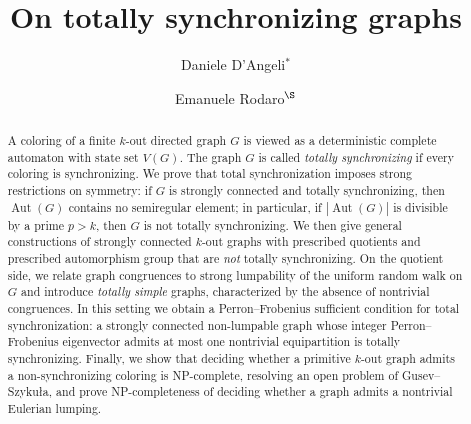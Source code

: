 \documentclass[a4paper,10pt]{amsart}
\title{On totally synchronizing graphs}
\author{Daniele D'Angeli$^{\ast}$}
\author{Emanuele Rodaro$^{\S}$}
\theoremstyle{plain}
\theoremstyle{definition}
\DeclareMathOperator{\Aut}{Aut}
\begin{document}
\begin{abstract}
A coloring of a finite $k$-out directed graph $G$ is viewed as a deterministic complete automaton with state set $V(G)$. The graph $G$ is called \emph{totally synchronizing} if every coloring is synchronizing.
We prove that total synchronization imposes strong restrictions on symmetry: if $G$ is strongly connected and totally synchronizing, then $\Aut(G)$ contains no semiregular element; in particular, if $|\Aut(G)|$ is divisible by a prime $p>k$, then $G$ is not totally synchronizing.
We then give general constructions of strongly connected $k$-out graphs with prescribed quotients and prescribed automorphism group that are \emph{not} totally synchronizing.
On the quotient side, we relate graph congruences to strong lumpability of the uniform random walk on $G$ and introduce \emph{totally simple} graphs, characterized by the absence of nontrivial congruences.
In this setting we obtain a Perron--Frobenius sufficient condition for total synchronization: a strongly connected non-lumpable graph whose integer Perron--Frobenius eigenvector admits at most one nontrivial equipartition is totally synchronizing.
Finally, we show that deciding whether a primitive $k$-out graph admits a non-synchronizing coloring is NP-complete, resolving an open problem of Gusev--Szyku{\l}a, and prove NP-completeness of deciding whether a graph admits a nontrivial Eulerian lumping.
\end{abstract}


\maketitle
\end{document}
